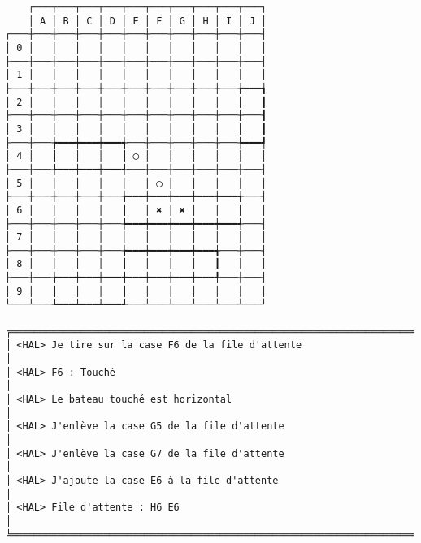 {\scriptsize
\begin{verbatim}
    ┌───┬───┬───┬───┬───┬───┬───┬───┬───┬───┐
    │ A │ B │ C │ D │ E │ F │ G │ H │ I │ J │
┌───┼───┼───┼───┼───┼───┼───┼───┼───┼───┼───┤
│ 0 │   │   │   │   │   │   │   │   │   │   │
├───┼───┼───┼───┼───┼───┼───┼───┼───┼───┼───┤
│ 1 │   │   │   │   │   │   │   │   │   │   │
├───┼───┼───┼───┼───┼───┼───┼───┼───┼───╆━━━┪
│ 2 │   │   │   │   │   │   │   │   │   ┃   ┃
├───┼───┼───┼───┼───┼───┼───┼───┼───┼───╂───┨
│ 3 │   │   │   │   │   │   │   │   │   ┃   ┃
├───┼───╆━━━┿━━━┿━━━╅───┼───┼───┼───┼───╄━━━┩
│ 4 │   ┃   │   │   ┃ ◯ │   │   │   │   │   │
├───┼───╄━━━┿━━━┿━━━╃───┼───┼───┼───┼───┼───┤
│ 5 │   │   │   │   │   │ ◯ │   │   │   │   │
├───┼───┼───┼───┼───╆━━━┿━━━┿━━━┿━━━┿━━━╅───┤
│ 6 │   │   │   │   ┃   │ ✖ │ ✖ │   │   ┃   │
├───┼───┼───┼───┼───╄━━━┿━━━┿━━━┿━━━┿━━━╃───┤
│ 7 │   │   │   │   │   │   │   │   │   │   │
├───┼───┼───┼───┼───╆━━━┿━━━┿━━━┿━━━╅───┼───┤
│ 8 │   │   │   │   ┃   │   │   │   ┃   │   │
├───┼───╆━━━┿━━━┿━━━╋━━━┿━━━┿━━━┿━━━╃───┼───┤
│ 9 │   ┃   │   │   ┃   │   │   │   │   │   │
└───┴───┺━━━┷━━━┷━━━┹───┴───┴───┴───┴───┴───┘

╔══════════════════════════════════════════════════════════════════════════════════════════════════╗
║ <HAL> Je tire sur la case F6 de la file d'attente                                                ║
║ <HAL> F6 : Touché                                                                                ║
║ <HAL> Le bateau touché est horizontal                                                            ║
║ <HAL> J'enlève la case G5 de la file d'attente                                                   ║
║ <HAL> J'enlève la case G7 de la file d'attente                                                   ║
║ <HAL> J'ajoute la case E6 à la file d'attente                                                    ║
║ <HAL> File d'attente : H6 E6                                                                     ║
╚══════════════════════════════════════════════════════════════════════════════════════════════════╝
\end{verbatim}}
\newpage

